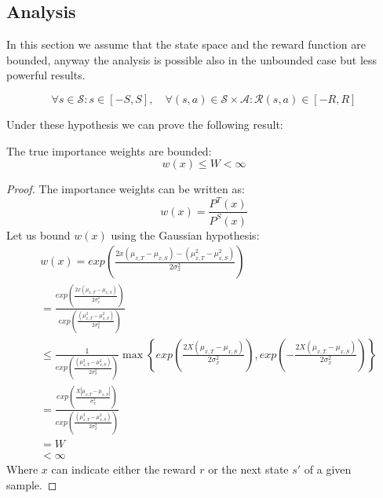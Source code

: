       \subsection{Analysis}
      \noindent In this section we assume that the state space and the reward function are bounded, anyway the analysis is
      possible also in the unbounded case but less powerful results.

      \begin{equation*}
        \forall s \in \mathcal{S} : s \in [-S,S], \quad \forall (s,a) \in \mathcal{S} \times \mathcal{A} : \mathcal{R}(s,a) \in [-R,R]
      \end{equation*}

      \noindent Under these hypothesis we can prove the following result:

      \begin{lemma} The true importance weights are bounded:
        \begin{equation}
          w(x) \leq W < \infty
        \end{equation}
      \end{lemma}
      \begin{proof}
        The importance weights can be written as:
        \begin{equation}
            w(x) = \frac{P^{T}(x)}{P^{S}(x)}
        \end{equation}
        Let us bound $w(x)$ using the Gaussian hypothesis:
        \begin{equation}
          \begin{aligned}
              & w(x) = exp \left ( \frac{2x(\mu_{x,T} - \mu_{x,S}) - (\mu^{2}_{x,T} - \mu^{2}_{x,S})}{2\sigma^{2}_{x}} \right ) \\
              & = \frac{exp \left ( \frac{2x(\mu_{x,T} - \mu_{x,S})}{2\sigma^{2}_{x}} \right )}{exp \left ( \frac{(\mu^{2}_{x,T} - \mu^{2}_{x,S})}{2\sigma^{2}_{x}} \right )} \\
              & \leq \frac{1}{exp \left ( \frac{(\mu^{2}_{x,T} - \mu^{2}_{x,S})}{2\sigma^{2}_{x}} \right )} \max \left \{ exp \left ( \frac{2X(\mu_{x,T} - \mu_{x,S})}{2\sigma_{x}^{2}} \right ), exp \left ( - \frac{2X(\mu_{x,T} - \mu_{x,S})}{2\sigma_{x}^{2}} \right ) \right \} \\
              & = \frac{exp \left ( \frac{X|\mu_{x,T} - \mu_{x,S}|}{\sigma^{2}_{x}} \right )}{exp \left ( \frac{(\mu^{2}_{x,T} - \mu^{2}_{x,S})}{2\sigma^{2}_{x}} \right )} \\
              & = W \\
              & < \infty
          \end{aligned}
        \end{equation}
        Where $x$ can indicate either the reward $r$ or the next state $s'$ of a given sample.
      \end{proof}


